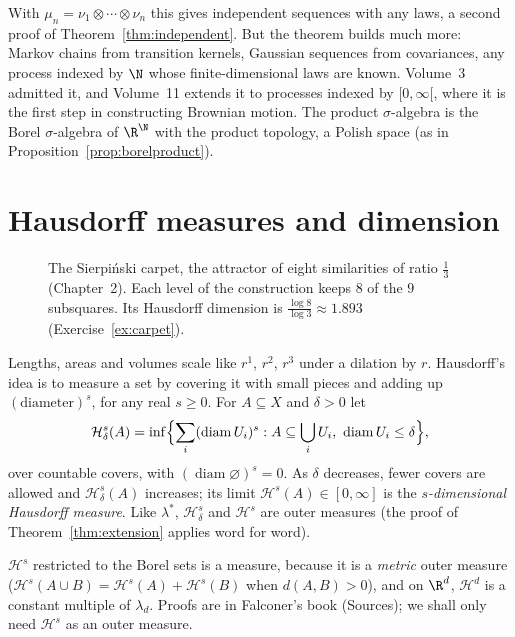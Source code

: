 With $\mu_n=\nu_1\otimes\cdots\otimes\nu_n$ this gives independent sequences with any laws, a second proof of Theorem~\ref{thm:independent}. But the theorem builds much more: Markov chains from transition kernels, Gaussian
sequences from covariances, any process indexed by $\N$ whose finite-dimensional laws are known. Volume~3 admitted it, and Volume~11 extends it to processes indexed by $[0,\infty[$, where it is the first step in constructing
Brownian motion. The product $\sigma$-algebra is the Borel $\sigma$-algebra of $\R^\N$ with the product topology, a Polish space (as in Proposition~\ref{prop:borelproduct}).

\section{Hausdorff measures and dimension}

\begin{figure}[ht]
\centering
{}
\caption{The Sierpi\'nski carpet, the attractor of eight similarities of ratio $\frac13$ (Chapter~2). Each level of the construction keeps $8$ of the $9$ subsquares. Its Hausdorff dimension is $\frac{\log8}{\log3}\approx1.893$
(Exercise~\ref{ex:carpet}).}
\label{fig:carpet}
\end{figure}

Lengths, areas and volumes scale like $r^1$, $r^2$, $r^3$ under a dilation by $r$. Hausdorff's idea is to measure a set by covering it with small pieces and adding up $(\text{diameter})^s$, for any real $s\ge0$. For $A\subseteq X$
and $\delta>0$ let
\[\mathcal H^s_\delta(A)=\inf\Bigl\{\sum_i(\operatorname{diam}U_i)^s:A\subseteq\bigcup_iU_i,\ \operatorname{diam}U_i\le\delta\Bigr\},\]
over countable covers, with $(\operatorname{diam}\varnothing)^s=0$. As $\delta$ decreases, fewer covers are allowed and $\mathcal H^s_\delta(A)$ increases; its limit $\mathcal H^s(A)\in[0,\infty]$ is the \emph{$s$-dimensional Hausdorff measure}. Like
$\lambda^*$, $\mathcal H^s_\delta$ and $\mathcal H^s$ are outer measures (the proof of Theorem~\ref{thm:extension} applies word for word).

\begin{remark}
$\mathcal H^s$ restricted to the Borel sets is a measure, because it is a \emph{metric} outer measure ($\mathcal H^s(A\cup B)=\mathcal H^s(A)+\mathcal H^s(B)$ when $d(A,B)>0$), and on $\R^d$, $\mathcal H^d$ is a constant multiple of $\lambda_d$.
Proofs are in Falconer's book (Sources); we shall only need $\mathcal H^s$ as an outer measure.
\end{remark}

